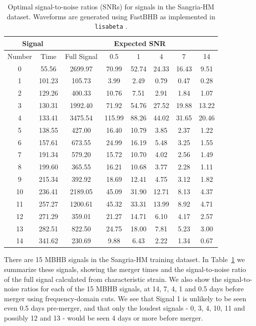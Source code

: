 \documentclass[%
 reprint,
superscriptaddress,
 nofootinbib,
 amsmath,amssymb,
 aps,
 prd,
]{revtex4-2}
\begin{document}
\begin{table}
    \begin{tabular}{|cc|c|ccccc|}
    \hline
    \multicolumn{2}{|c|}{Signal}& \multicolumn{6}{c|}{Expected SNR} \\
    \hline
    Number & Time  & Full Signal & 0.5 & 1 & 4 & 7 & 14 \\
    \hline
    0 & 55.56 & 2699.97 & 70.99 & 52.74 & 24.33 & 16.43 & 9.51 \\
    1 & 101.23 & 105.73 & 3.99 & 2.49 & 0.79 & 0.47 & 0.28 \\
    2 & 129.26 & 400.33 & 10.76 & 7.51 & 2.91 & 1.84 & 1.07 \\
    3 & 130.31 & 1992.40 & 71.92 & 54.76 & 27.52 & 19.88 & 13.22 \\
    4 & 133.41 & 3475.54 & 115.99 & 88.26 & 44.02 & 31.65 & 20.46 \\
    5 & 138.55 & 427.00 & 16.40 & 10.79 & 3.85 & 2.37 & 1.22 \\
    6 & 157.61 & 673.55 & 24.99 & 16.19 & 5.48 & 3.25 & 1.55 \\
    7 & 191.34 & 579.20 & 15.72 & 10.70 & 4.02 & 2.56 & 1.49 \\
    8 & 199.60 & 365.55 & 16.21 & 10.68 & 3.77 & 2.28 & 1.11 \\
    9 & 215.34 & 392.92 & 18.69 & 12.41 & 4.75 & 3.12 & 1.82 \\
    10 & 236.41 & 2189.05 & 45.09 & 31.90 & 12.71 & 8.13 & 4.37 \\
    11 & 257.27 & 1200.61 & 45.32 & 33.31 & 13.99 & 8.92 & 4.71 \\
    12 & 271.29 & 359.01 & 21.27 & 14.71 & 6.10 & 4.17 & 2.57 \\
    13 & 282.51 & 822.50 & 24.75 & 18.00 & 7.81 & 5.23 & 3.00 \\
    14 & 341.62 & 230.69 & 9.88 & 6.43 & 2.22 & 1.34 & 0.67 \\
    \hline
    \end{tabular}
    \caption{
        Optimal signal-to-noise ratios (SNRs) for signals in the Sangria-HM dataset.
        Waveforms are generated using FastBHB as implemented in \texttt{lisabeta} \cite{Marsat:2020rtl}.
    }
    \label{tab:characteristic_strain_snr}
\end{table}

There are 15 \ac{MBHB} signals in the Sangria-HM training dataset.
In Table~\ref{tab:characteristic_strain_snr} we summarize these signals, showing the merger
times and the signal-to-noise ratio of the full signal calculated from characteristic strain.
We also show the signal-to-noise ratios for each of the 15 \ac{MBHB} signals, at 14, 7, 4, 1 and 0.5 days before merger using frequency-domain cuts.
We see that Signal 1 is unlikely to be seen even 0.5 days pre-merger, and that only the loudest signals - 0, 3, 4, 10, 11 and possibly 12 and 13 - would be seen 4 days or more before merger.
\end{document}
